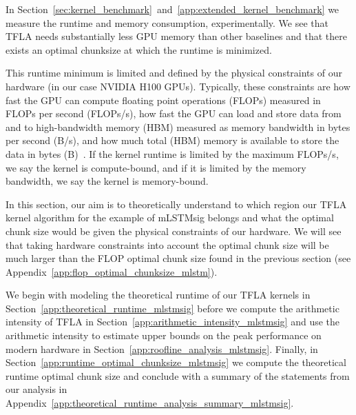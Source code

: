 \documentclass{article}
\begin{document}
    In Section~\ref{sec:kernel_benchmark}~and~\ref{app:extended_kernel_benchmark} we measure the runtime and memory consumption, experimentally. We see that TFLA needs substantially less GPU memory than other baselines and that there exists an optimal chunksize at which the runtime is minimized.

    This runtime minimum is limited and defined by the physical constraints of our hardware (in our case NVIDIA H100 GPUs).
    Typically, these constraints are how fast the GPU can compute floating point operations (FLOPs) measured in FLOPs per second (FLOPs/s), how fast the GPU can load and store data from and to high-bandwidth memory (HBM) measured as memory bandwidth in bytes per second (B/s), and how much total (HBM) memory is available to store the data in bytes (B)~\citep[Part 1]{austin:25scaling-book}.
    If the kernel runtime is limited by the maximum FLOPs/s, we say the kernel is compute-bound, and if it is limited by the memory bandwidth, we say the kernel is memory-bound.

    In this section, our aim is to theoretically understand to which region our TFLA kernel algorithm for the example of mLSTMsig belongs and what the optimal chunk size would be given the physical constraints of our hardware. 
    We will see that taking hardware constraints into account the optimal chunk size will be much larger than the FLOP optimal chunk size found in the previous section (see Appendix~\ref{app:flop_optimal_chunksize_mlstm}).

    We begin with modeling the theoretical runtime of our TFLA kernels in Section~\ref{app:theoretical_runtime_mlstmsig} before we compute the arithmetic intensity of TFLA in Section~\ref{app:arithmetic_intensity_mlstmsig} and use the arithmetic intensity to estimate upper bounds on the peak performance on modern hardware in Section~\ref{app:roofline_analysis_mlstmsig}.
    Finally, in Section~\ref{app:runtime_optimal_chunksize_mlstmsig} we compute the theoretical runtime optimal chunk size and conclude with a summary of the statements from our analysis in Appendix~\ref{app:theoretical_runtime_analysis_summary_mlstmsig}.

    \newcommand{\timeflops}[1]{\tau_{\text{ FLOPs}{{#1}}}}
    \newcommand{\timebytes}[1]{\tau_{\text{ Bytes}{{#1}}}}
    \newcommand{\flopsalgo}{\text{FLOPs}}
    \newcommand{\bytesalgo}{\text{Bytes}}

    \newcommand{\accflops}[1]{\alpha_{\text{ FLOPs}{{#1}}}}
    \newcommand{\accbytes}[1]{\beta_{\text{ Bytes}{{#1}}}}
\end{document}
